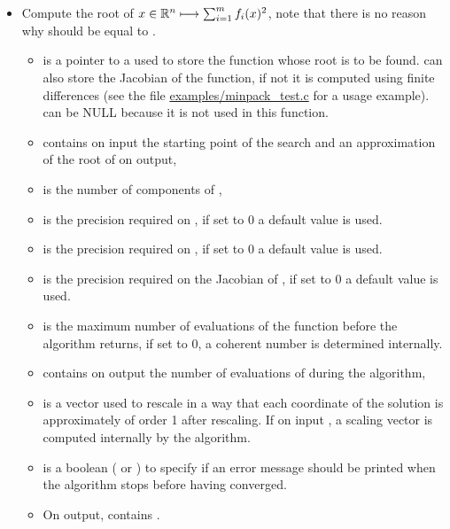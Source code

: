 \begin{itemize}
\item {}
  \sshortdescribe Compute the root of $x \in {\mathbb R}^n \longmapsto
  \sum_{i=1}^m f_i(x)^2$, note that there is no reason why  should
  be equal to .
  \parameters
  \begin{itemize}
  \item {} is a pointer to a  used to
    store the function whose root is to be found.  can also
    store the Jacobian of the function, if not it is computed using
    finite differences (see the file \url{examples/minpack_test.c} for
    a usage example).  can be NULL because it is
    not used in this function.
  \item  {} contains on input the starting
    point of the search and an approximation of the root of  on
    output,
  \item {} is the number of components of ,
  \item {} is the precision required on , if set to 0 a
    default value is used.
  \item {} is the precision required on , if set to 0 a
    default value is used.
  \item {} is the precision required on the Jacobian of
    , if set to 0 a default value is used.
  \item {} is the maximum number of evaluations of the function
     before the algorithm returns, if set to 0, a coherent
    number is determined internally.
  \item {} contains on output the number of evaluations of
     during the algorithm,
  \item {} is a vector used to rescale  in a way that
    each coordinate of the solution is approximately of order 1 after
    rescaling.  If on input , a scaling vector is
    computed internally by the algorithm.
  \item {} is a boolean ( or ) to
    specify if an error message should be printed when the algorithm
    stops before having converged.
  \item On output,  contains .
  \end{itemize}
\end{itemize}


